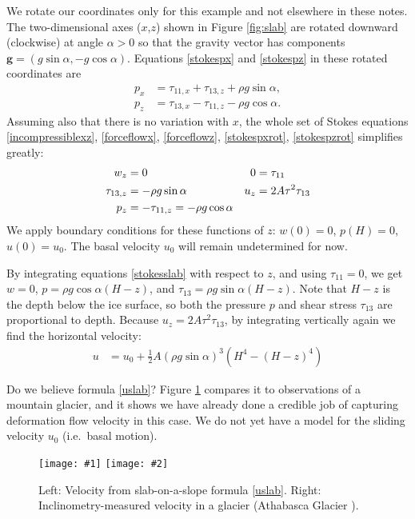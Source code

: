 \documentclass[letterpaper,final,12pt,reqno]{amsart}
\newcommand{\twofigsizes}[5]{
\begin{figure}[ht]
\centering
\texttt{[image: \#1]} \quad
\texttt{[image: \#2]}
\caption{#3}
\label{fig:#1}
\end{figure}}
\begin{document}
We rotate our coordinates only for this example and not elsewhere in these notes.  The two-dimensional axes ($x$,$z$) shown in Figure \ref{fig:slab} are rotated downward (clockwise) at angle $\alpha>0$ so that the gravity vector has components $\mathbf{g} = (g \sin\alpha,- g \cos \alpha)$.  Equations \eqref{stokespx} and \eqref{stokespz} in these rotated coordinates are
\begin{align}
p_x &= \tau_{11,x} + \tau_{13,z} + \rho g \sin\alpha, \label{stokespxrot} \\
p_z &= \tau_{13,x} - \tau_{11,z} - \rho g \cos\alpha. \label{stokespzrot}
\end{align}
Assuming also that there is no variation with $x$, the whole set of Stokes equations \eqref{incompressiblexz}, \eqref{forceflowx}, \eqref{forceflowz}, \eqref{stokespxrot}, \eqref{stokespzrot} simplifies greatly:
\begin{align}
w_z &= 0 &   0 &= \tau_{11} \label{stokesslab} \\
\tau_{13,z} &= - \rho g \sin\alpha &   u_z &= 2 A \tau^2 \tau_{13} \notag \\
p_z &= -\tau_{11,z} = - \rho g \cos\alpha \notag
\end{align}
We apply boundary conditions for these functions of $z$: $w(0)=0$, $p(H)=0$, $u(0)=u_0$.  The basal velocity $u_0$ will remain undetermined for now.

By integrating equations \eqref{stokesslab} with respect to $z$, and using $\tau_{11}=0$, we get $w=0$, $p = \rho g \cos\alpha (H-z)$, and $\tau_{13} = \rho g \sin\alpha (H-z)$.  Note that $H-z$ is the depth below the ice surface, so both the pressure $p$ and shear stress $\tau_{13}$ are proportional to depth.  Because $u_z = 2 A \tau^2 \tau_{13}$, by integrating vertically again we find the horizontal velocity:
\begin{align}
u &= u_0 + \frac{1}{2} A (\rho g \sin\alpha)^3  \left(H^4 - (H-z)^4\right)  \label{uslab}
\end{align}

Do we believe formula \eqref{uslab}?  Figure \ref{fig:slabvel} compares it to observations of a mountain glacier, and it shows we have already done a credible job of capturing deformation flow velocity in this case.  We do not yet have a model for the sliding velocity $u_0$ (i.e.~basal motion).  

\twofigsizes{slabvel}{athabasca-deform}{Left:  Velocity from slab-on-a-slope formula \eqref{uslab}.  Right:  Inclinometry-measured velocity in a glacier (Athabasca Glacier \cite{SavagePaterson}).}{2.0in}{1.8in}
\end{document}

